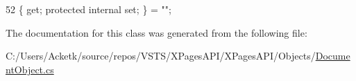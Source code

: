\begin{DoxyCode}
52 \{ \textcolor{keyword}{get}; \textcolor{keyword}{protected} \textcolor{keyword}{internal} \textcolor{keyword}{set}; \} = \textcolor{stringliteral}{""};
\end{DoxyCode}


The documentation for this class was generated from the following file\+:\begin{DoxyCompactItemize}
\item 
C\+:/\+Users/\+Acketk/source/repos/\+V\+S\+T\+S/\+X\+Pages\+A\+P\+I/\+X\+Pages\+A\+P\+I/\+Objects/\mbox{\hyperlink{_document_object_8cs}{Document\+Object.\+cs}}\end{DoxyCompactItemize}
